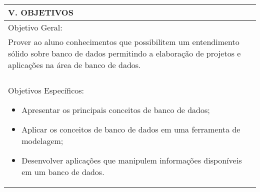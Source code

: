 \documentclass[12pt]{article}
\begin{document}
\begin{longtable}{|L{1.025\textwidth}|} \hline
%
{\bf V. OBJETIVOS } \\ \hline
Objetivo Geral:\\

Prover ao aluno conhecimentos que possibilitem um entendimento sólido sobre banco de dados permitindo a elaboração de projetos e aplicações na área de banco de dados.\\
\\
Objetivos Específicos:
\begin{itemize}
\item Apresentar os principais conceitos de banco de dados;
\item Aplicar os conceitos de banco de dados em uma ferramenta de modelagem;
\item Desenvolver aplicações que manipulem informações disponíveis em um banco de dados.
\end{itemize}

\\ \hline
\end{longtable}
\end{document}
